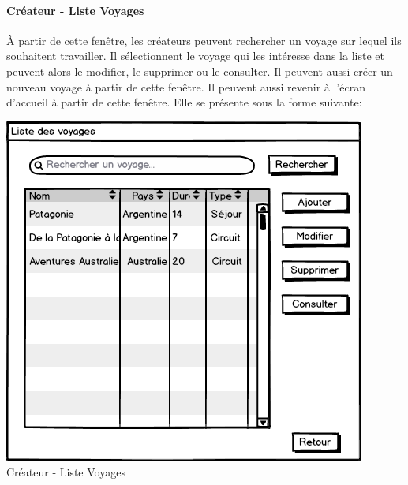 \documentclass[12pt]{article}
\begin{document}
\paragraph{Créateur - Liste Voyages}
À partir de cette fenêtre, les créateurs peuvent rechercher un voyage sur lequel ils souhaitent travailler. Il sélectionnent le voyage qui les intéresse dans la liste et peuvent alors le modifier, le supprimer ou le consulter. Il peuvent aussi créer un nouveau voyage à partir de cette fenêtre. Il peuvent aussi revenir à l'écran d'accueil à partir de cette fenêtre. Elle se présente sous la forme suivante:
\begin{center}
\includegraphics[scale = 0.5]{../Conception_graphique/png_Pour_CR/Createur-20-Liste_Voyages.png}
\newline
Créateur - Liste Voyages
\label{fig:Cr-Liste_Voyage}
\end{center}
\end{document}
